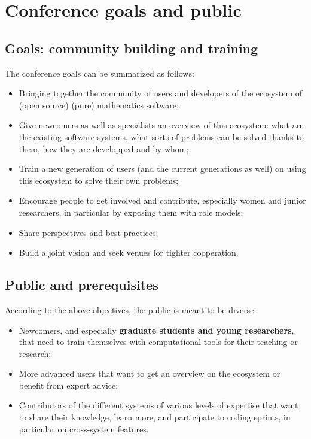 \documentclass[12pt]{amsart}
\begin{document}
\section{Conference goals and public}

\subsection{Goals: community building and training}

The conference goals can be summarized as follows:

\begin{itemize}
\item Bringing together the community of users and developers of the
  ecosystem of (open source) (pure) mathematics software;
\item Give newcomers as well as specialists an overview of this
  ecosystem: what are the existing software systems, what sorts of
  problems can be solved thanks to them, how they are developped and
  by whom;
\item Train a new generation of users (and the current generations as
  well) on using this ecosystem to solve their own problems;
\item Encourage people to get involved and contribute, especially
  women and junior researchers, in particular by exposing them with role models;
\item Share perspectives and best practices;
\item Build a joint vision and
  seek venues for tighter cooperation.
\end{itemize}

\subsection{Public and prerequisites}

According to the above objectives, the public is meant to be diverse:
\begin{itemize}
\item Newcomers, and especially \textbf{graduate students and young
    researchers}, that need to train themselves with computational
  tools for their teaching or research;
\item More advanced users that want to get an overview on the
  ecosystem or benefit from expert advice;
\item Contributors of the different systems of various levels of
  expertise that want to share their knowledge, learn more, and
  participate to coding sprints, in particular on cross-system
  features.
\end{itemize}
\end{document}
